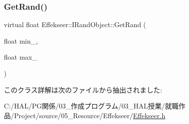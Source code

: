 \mbox{\label{class_effekseer_1_1_i_rand_object_a2c7b39779f597094973517df4afa0b48}} 
\subsubsection{\texorpdfstring{Get\+Rand()}{GetRand()}\hspace{0.1cm}{\footnotesize\ttfamily [2/2]}}
{\footnotesize\ttfamily virtual float Effekseer\+::\+I\+Rand\+Object\+::\+Get\+Rand (\begin{DoxyParamCaption}\item[{float}]{min\+\_\+,  }\item[{float}]{max\+\_\+ }\end{DoxyParamCaption})\hspace{0.3cm}{\ttfamily [pure virtual]}}



このクラス詳解は次のファイルから抽出されました\+:\begin{DoxyCompactItemize}
\item 
C\+:/\+H\+A\+L/\+P\+G関係/03\+\_\+作成プログラム/03\+\_\+\+H\+A\+L授業/就職作品/\+Project/source/05\+\_\+\+Resource/\+Effekseer/\mbox{\hyperlink{_effekseer_8h}{Effekseer.\+h}}\end{DoxyCompactItemize}

